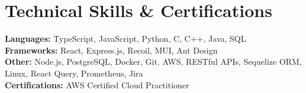 \documentclass[letterpaper]{article}
\begin{document}
\color{NavyBlue}
\section{Technical Skills \& Certifications}
\color{Black}
 \begin{itemize}[leftmargin=0.15in, label={}]
    \small{\item{
        \textbf{Languages:}{ TypeScript, JavaScript, Python, C, C++, Java, SQL} \\
        \textbf{Frameworks:}{ React, Express.js, Recoil, MUI, Ant Design} \\
        \textbf{Other:}{ Node.js, PostgreSQL, Docker, Git, AWS, RESTful APIs, Sequelize ORM, Linux, React Query, Prometheus, Jira} \\
        \textbf{Certifications:}{ AWS Certified Cloud Practitioner}
    }}
 \end{itemize}
 

\end{document}
